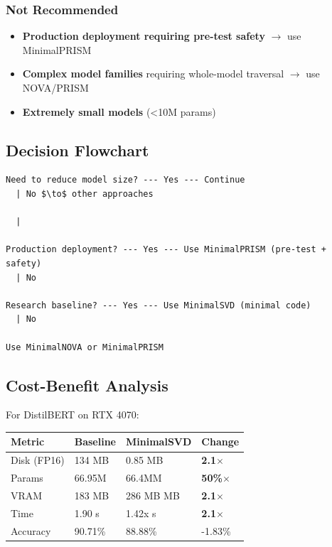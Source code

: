 \subsubsection{Not Recommended}

\begin{itemize}
\item \textbf{Production deployment requiring pre-test safety} $\to$ use MinimalPRISM
\item \textbf{Complex model families} requiring whole-model traversal $\to$ use NOVA/PRISM
\item \textbf{Extremely small models} (\textless{}10M params)

\end{itemize}
\subsection{Decision Flowchart}

\begin{lstlisting}
Need to reduce model size? --- Yes --- Continue
  | No $\to$ other approaches

  |
   
Production deployment? --- Yes --- Use MinimalPRISM (pre-test + safety)
  | No
   
Research baseline? --- Yes --- Use MinimalSVD (minimal code)
  | No
   
Use MinimalNOVA or MinimalPRISM
\end{lstlisting}

\subsection{Cost-Benefit Analysis}

For DistilBERT on RTX 4070:

\begin{table}[H]
\centering
\small
\begin{tabular}{llll}
\toprule
\textbf{Metric} & \textbf{Baseline} & \textbf{MinimalSVD} & \textbf{Change} \\
\midrule
Disk (FP16) & 134 MB & 0.85 MB & \textbf{2.1$\times$} \\
Params & 66.95M & 66.4MM & \textbf{50\%$\times$} \\
VRAM & 183 MB & 286 MB MB & \textbf{2.1$\times$} \\
Time & 1.90 s & 1.42x s & \textbf{2.1$\times$} \\
Accuracy & 90.71\% & 88.88\% & -1.83\% \\
\bottomrule
\end{tabular}
\end{table}

